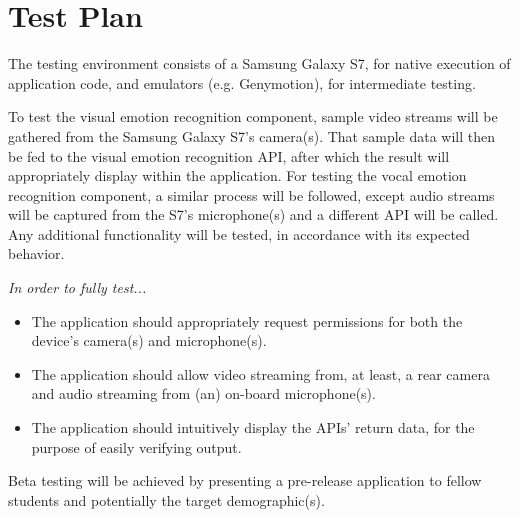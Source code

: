 \chapter{Test Plan}
The testing environment consists of a Samsung Galaxy S7, for native execution of application code, and emulators (e.g. Genymotion), for intermediate testing.

To test the visual emotion recognition component, sample video streams will be gathered from the Samsung Galaxy S7's camera(s). That sample data will then be fed to the visual emotion recognition API, after which the result will appropriately display within the application. For testing the vocal emotion recognition component, a similar process will be followed, except audio streams will be captured from the S7's microphone(s) and a different API will be called. Any additional functionality will be tested, in accordance with its expected behavior.

\vspace{5mm}
\textit{In order to fully test...}
\begin{itemize}
    \item The application should appropriately request permissions for both the device's camera(s) and microphone(s).
    \item The application should allow video streaming from, at least, a rear camera and audio streaming from (an) on-board microphone(s).
    \item The application should intuitively display the APIs' return data, for the purpose of easily verifying output.
\end {itemize}

\vspace{5mm}
Beta testing will be achieved by presenting a pre-release application to fellow students and potentially the target demographic(s).
